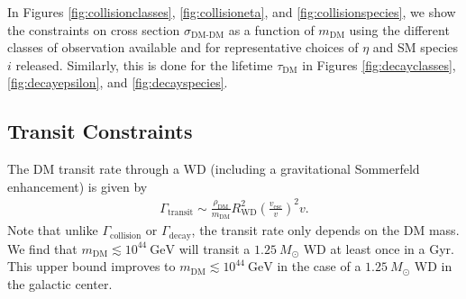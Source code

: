 \documentclass[twocolumn,showpacs,preprintnumbers,amsmath,amssymb,prd]{revtex4}
\newcommand{\GeV}{\text{GeV}}
\def\r{\right)}
\def\l{\left(}
\begin{document}
In Figures \ref{fig:collisionclasses}, \ref{fig:collisioneta}, and \ref{fig:collisionspecies}, we show the constraints on cross section $\sigma_\text{DM-DM}$ as a function of $m_\text{DM}$ using the different classes of observation available and for representative choices of $\eta$ and SM species $i$ released.
Similarly, this is done for the lifetime $\tau_\text{DM}$ in Figures \ref{fig:decayclasses}, \ref{fig:decayepsilon}, and \ref{fig:decayspecies}.
 

\subsection{Transit Constraints}
\label{sec:TransitConstraints}

The DM transit rate through a WD (including a gravitational Sommerfeld enhancement) is given by
\begin{align}
\Gamma_\text{transit} \sim \frac{\rho_{\text{DM}}}{m_\text{DM}} R_\text{WD}^2 \l\frac{v_\text{esc}}{v}\r^2 v.
\label{eq:TransitFluxCondition}
\end{align}
Note that unlike $\Gamma_\text{collision}$ or $\Gamma_\text{decay}$, the transit rate only depends on the DM mass.
We find that $m_\text{DM} \lesssim 10^{44} ~\GeV$ will transit a $1.25 ~M_{\odot}$ WD at least once in a Gyr.
This upper bound improves to $m_\text{DM} \lesssim 10^{44} ~\GeV$ in the case of a $1.25 ~M_{\odot}$ WD in the galactic center.
\end{document}
